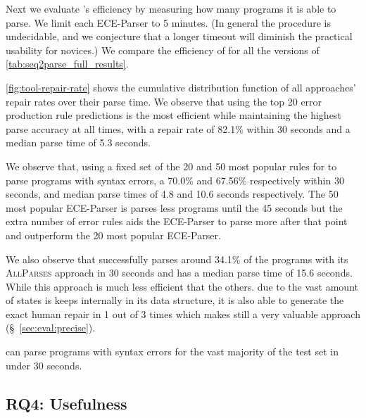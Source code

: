 
Next we evaluate \toolname's efficiency by measuring how many programs it is
able to parse. We limit each ECE-Parser to 5 minutes. (In general the procedure
is undecidable, and we conjecture that a longer timeout will diminish the
practical usability for novices.) We compare the efficiency of \toolname for all
the versions of \autoref{tab:seq2parse_full_results}.

\autoref{fig:tool-repair-rate} shows the cumulative distribution function of all
\toolname approaches' repair rates over their parse time. We observe that using
the top 20 error production rule predictions is the most efficient while
maintaining the highest parse accuracy at all times, with a repair rate of
82.1\% within 30 seconds and a median parse time of 5.3 seconds.

We observe that, using a fixed set of the 20 and 50 most popular rules for
\toolname to parse programs with syntax errors, a 70.0\% and 67.56\%
respectively within 30 seconds, and median parse times of 4.8 and 10.6 seconds
respectively. The 50 most popular ECE-Parser is parses less programs until the
45 seconds but the extra number of error rules aids the ECE-Parser to parse more
after that point and outperform the 20 most popular ECE-Parser.

We also observe that \toolname successfully parses around 34.1\% of the programs
with its \textsc{AllParses} approach in 30 seconds and has a median parse time
of 15.6 seconds. While this approach is much less efficient that the others. due
to the vast amount of states is keeps internally in its data structure, it is
also able to generate the exact human repair in 1 out of 3 times which makes
still a very valuable approach (\S~\ref{sec:eval:precise}).

\begin{framed}
  \noindent \toolname can parse programs with syntax errors for the vast
  majority of the test set in under 30 seconds.
\end{framed}

\subsection{RQ4: Usefulness}
\label{sec:eval:useful}
